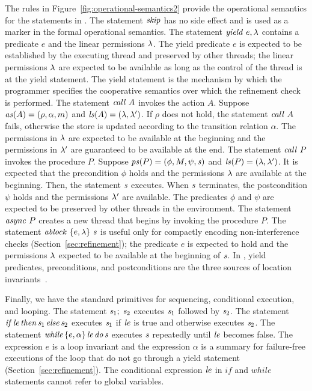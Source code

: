 The rules in Figure~\ref{fig:operational-semantics2} provide the operational semantics for the statements in \civl.
The statement $\mathit{skip}$ has no side effect and is used as a marker in the formal operational semantics.
The statement $\mathit{yield}\ e,\lambda$ contains a predicate $e$ and the linear permissions $\lambda$.
The yield predicate $e$ is expected to be established by the executing thread and preserved by other threads;
the linear permissions $\lambda$ are expected to be available as long as the control of the thread
is at the yield statement.
The yield statement is the mechanism by which the programmer specifies the cooperative semantics over which 
the refinement check is performed.
The statement $\mathit{call}\ A$ invokes the action $A$.
Suppose $\mathit{as}(A) = (\rho, \alpha, m)$ and $\mathit{ls}(A) = (\lambda, \lambda')$.
If $\rho$ does not hold, the statement $\mathit{call}\ A$ fails, 
otherwise the store is updated according to the transition relation $\alpha$.
The permissions in $\lambda$ are expected to be available at the beginning
and the permissions in $\lambda'$ are guaranteed to be available at the end.
The statement $\mathit{call}\ P$ invokes the procedure $P$.
Suppose $\mathit{ps}(P) = (\phi, M, \psi, \mathit{s})$ and $\mathit{ls}(P) = (\lambda, \lambda')$.
It is expected that the precondition $\phi$ holds and the permissions $\lambda$ are available at the beginning.
Then, the statement $\mathit{s}$ executes.
When $\mathit{s}$ terminates, the postcondition $\psi$ holds and the permissions $\lambda'$ are available.
The predicates $\phi$ and $\psi$ are expected to be preserved by other threads in the environment. 
The statement $\mathit{async}\ P$ creates a new thread that begins by invoking the procedure $P$.
The statement $\mathit{ablock}\ {\{e,\lambda\}}\ {\mathit{s}}$ is useful only for compactly encoding non-interference checks (Section~\ref{sec:refinement});
the predicate $e$ is expected to hold and the permissions $\lambda$ expected to be available at the beginning of $\mathit{s}$.
In \civl, yield predicates, preconditions, and postconditions are the three sources of location invariants~\cite{OwickiG76}.

Finally, we have the standard primitives for sequencing, conditional execution, and looping.
The statement $\mathit{s}_1;\;\mathit{s}_2$ executes $\mathit{s}_1$ followed by $\mathit{s}_2$.
The statement $\mathit{if}\hspace{0.5mm}{\mathit{le}}\hspace{0.5mm}\mathit{then}\hspace{0.5mm}{\mathit{s}_1}\hspace{0.5mm}\mathit{else}\hspace{0.5mm}{\mathit{s}_2}$ executes $\mathit{s}_1$ if $\mathit{le}$ is true and otherwise executes $\mathit{s}_2$.
The statement $\mathit{while}\hspace{0.5mm}\{e,\alpha\}\hspace{0.5mm}{\mathit{le}}\hspace{0.5mm}\mathit{do}\hspace{0.5mm}{\mathit{s}}$ executes $\mathit{s}$ repeatedly until $\mathit{le}$ becomes false.
The expression $e$ is a loop invariant and the expression $\alpha$ is a summary for failure-free executions of the loop that do not go 
through a yield statement (Section~\ref{sec:refinement}).
The conditional expression $\mathit{le}$ in $\mathit{if}$ and $\mathit{while}$ statements cannot refer to global variables.

